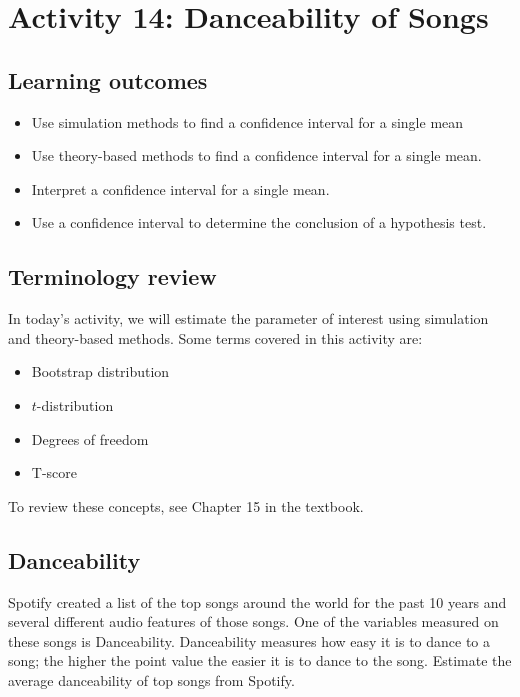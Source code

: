 \documentclass[
]{report}
\begin{document}
\vspace{0.8in}

\newpage

\section{Activity 14: Danceability of Songs}\label{activity-14-danceability-of-songs}


\subsection{Learning outcomes}\label{learning-outcomes-14}

\begin{itemize}
\item
  Use simulation methods to find a confidence interval for a single mean
\item
  Use theory-based methods to find a confidence interval for a single mean.
\item
  Interpret a confidence interval for a single mean.
\item
  Use a confidence interval to determine the conclusion of a hypothesis test.
\end{itemize}

\subsection{Terminology review}\label{terminology-review-12}

In today's activity, we will estimate the parameter of interest using simulation and theory-based methods. Some terms covered in this activity are:

\begin{itemize}
\item
  Bootstrap distribution
\item
  \(t\)-distribution
\item
  Degrees of freedom
\item
  T-score
\end{itemize}

To review these concepts, see Chapter 15 in the textbook.

\subsection{Danceability}\label{danceability}

Spotify created a list of the top songs around the world for the past 10 years and several different audio features of those songs. One of the variables measured on these songs is Danceability. Danceability measures how easy it is to dance to a song; the higher the point value the easier it is to dance to the song. Estimate the average danceability of top songs from Spotify.
\end{document}
